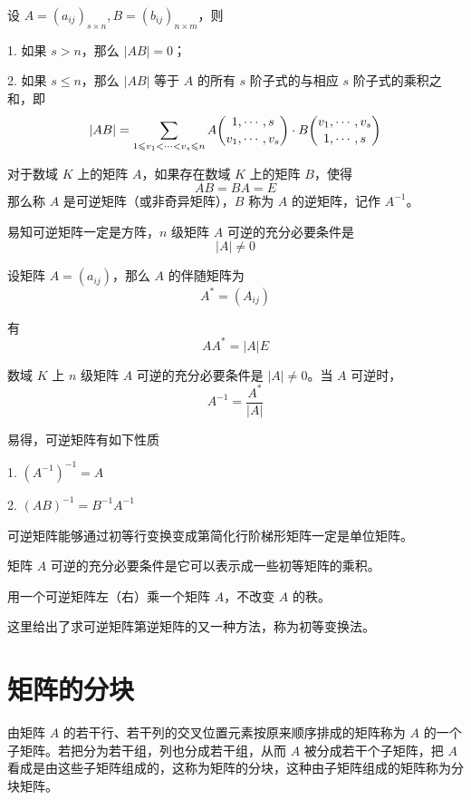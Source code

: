 \begin{theorem}
    设 $A = (a_{ij})_{s \times n},B = (b_{ij})_{n \times m}$，则

    1. 如果 $s>n$，那么 $|AB| = 0$；

    2. 如果 $s\leqslant n$，那么  $|AB|$ 等于 $A$ 的所有 $s$ 阶子式的与相应 $s$ 阶子式的乘积之和，即
    \[|AB|=\sum_{1 \leqslant v_1<\cdots< v_s \leqslant n}A \dbinom{1,\cdots,s}{v_1,\cdots,v_s} \cdot B \dbinom{v_1,\cdots,v_s}{1,\cdots,s}\]
\end{theorem}

\begin{definition}
    对于数域 $K$ 上的矩阵 $A$，如果存在数域 $K$ 上的矩阵 $B$，使得
    \[AB = BA = E\]
    那么称 $A$ 是可逆矩阵（或非奇异矩阵），$B$ 称为 $A$ 的逆矩阵，记作 $A^{-1}$。
\end{definition}

易知可逆矩阵一定是方阵，$n$ 级矩阵 $A$ 可逆的充分必要条件是
\[|A| \ne 0\]

\begin{definition}
    设矩阵 $A = (a_{ij})$，那么 $A$ 的伴随矩阵为
    \[A^*=(A_{ij})\]
\end{definition}

有
\[AA^* = |A|E\]

\begin{theorem}
    数域 $K$ 上 $n$ 级矩阵 $A$ 可逆的充分必要条件是 $|A| \ne 0$。当 $A$ 可逆时，
    \[A^{-1} = \frac{A^*}{|A|}\]
\end{theorem}

易得，可逆矩阵有如下性质

1. $(A^{-1})^{-1} = A$

2. $(AB)^{-1} = B^{-1}A^{-1}$

可逆矩阵能够通过初等行变换变成第简化行阶梯形矩阵一定是单位矩阵。

\begin{theorem}
    矩阵 $A$ 可逆的充分必要条件是它可以表示成一些初等矩阵的乘积。
\end{theorem}

用一个可逆矩阵左（右）乘一个矩阵 $A$，不改变 $A$ 的秩。

这里给出了求可逆矩阵第逆矩阵的又一种方法，称为初等变换法。

\section{矩阵的分块}

由矩阵 $A$ 的若干行、若干列的交叉位置元素按原来顺序排成的矩阵称为 $A$ 的一个子矩阵。若把分为若干组，列也分成若干组，从而 $A$ 被分成若干个子矩阵，把 $A$ 看成是由这些子矩阵组成的，这称为矩阵的分块，这种由子矩阵组成的矩阵称为分块矩阵。


